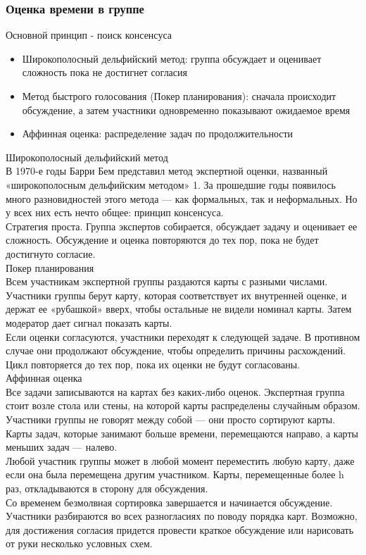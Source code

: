 \documentclass{../industrial-development}
\begin{document}
\begin{frame} \frametitle{Оценка времени в группе}
Основной принцип - поиск консенсуса
\begin{itemize}
  \item Широкополосный дельфийский метод: группа обсуждает и оценивает сложность пока не достигнет согласия
	\item Метод быстрого голосования (Покер планирования): сначала происходит обсуждение, а затем участники одновременно показывают ожидаемое время
	\item Аффинная оценка: распределение задач по продолжительности
\end{itemize}
\end{frame}
\lecturenotes
Широкополосный дельфийский метод\\
В 1970-е годы Барри Бем представил метод экспертной оценки, названный «широкополосным дельфийским методом» 1. За прошедшие годы появилось много разновидностей этого метода — как формальных, так и неформальных. Но у всех них есть нечто общее: принцип консенсуса.\\
Стратегия проста. Группа экспертов собирается, обсуждает задачу и оценивает ее сложность. Обсуждение и оценка повторяются до тех пор, пока не будет достигнуто согласие.\\
Покер планирования\\
Всем участникам экспертной группы раздаются карты с разными числами. Участники группы берут карту, которая соответствует их внутренней оценке, и держат ее «рубашкой» вверх, чтобы остальные не видели номинал карты. Затем модератор дает сигнал показать карты.\\
Если оценки согласуются, участники переходят к следующей задаче. В противном случае они продолжают обсуждение, чтобы определить причины расхождений. Цикл повторяется до тех пор, пока их оценки не будут согласованы.\\
Аффинная оценка\\
Все задачи записываются на картах без каких-либо оценок. Экспертная группа стоит возле стола или стены, на которой карты распределены случайным образом. Участники группы не говорят между собой — они просто сортируют карты. Карты задач, которые занимают больше времени, перемещаются направо, а карты меньших задач — налево.\\
Любой участник группы может в любой момент переместить любую карту, даже если она была перемещена другим участником. Карты, перемещенные более h раз, откладываются в сторону для обсуждения.\\
Со временем безмолвная сортировка завершается и начинается обсуждение. Участники разбираются во всех разногласиях по поводу порядка карт. Возможно, для достижения согласия придется провести краткое обсуждение или нарисовать от руки несколько условных схем.
\end{document}
